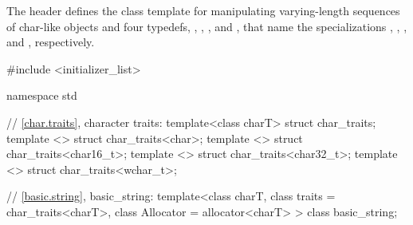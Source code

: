 \pnum
The header  defines the
 class template for manipulating
varying-length sequences of char-like objects and four
typedefs, ,
,
,
and , that name
the specializations
,
,
,
and
, respectively.


%
\begin{codeblock}
#include <initializer_list>

namespace std {

  // \ref{char.traits}, character traits:
  template<class charT> struct char_traits;
  template <> struct char_traits<char>;
  template <> struct char_traits<char16_t>;
  template <> struct char_traits<char32_t>;
  template <> struct char_traits<wchar_t>;

  // \ref{basic.string}, basic_string:
  template<class charT, class traits = char_traits<charT>,
    class Allocator = allocator<charT> >
      class basic_string;

}
\end{codeblock}

